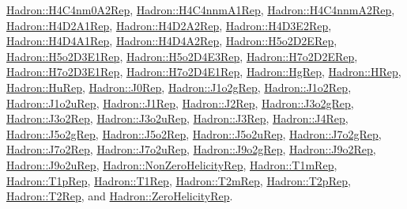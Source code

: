 \mbox{\hyperlink{structHadron_1_1H4C4nm0A2Rep}{Hadron\+::\+H4\+C4nm0\+A2\+Rep}}, \mbox{\hyperlink{structHadron_1_1H4C4nnmA1Rep}{Hadron\+::\+H4\+C4nnm\+A1\+Rep}}, \mbox{\hyperlink{structHadron_1_1H4C4nnmA2Rep}{Hadron\+::\+H4\+C4nnm\+A2\+Rep}}, \mbox{\hyperlink{structHadron_1_1H4D2A1Rep}{Hadron\+::\+H4\+D2\+A1\+Rep}}, \mbox{\hyperlink{structHadron_1_1H4D2A2Rep}{Hadron\+::\+H4\+D2\+A2\+Rep}}, \mbox{\hyperlink{structHadron_1_1H4D3E2Rep}{Hadron\+::\+H4\+D3\+E2\+Rep}}, \mbox{\hyperlink{structHadron_1_1H4D4A1Rep}{Hadron\+::\+H4\+D4\+A1\+Rep}}, \mbox{\hyperlink{structHadron_1_1H4D4A2Rep}{Hadron\+::\+H4\+D4\+A2\+Rep}}, \mbox{\hyperlink{structHadron_1_1H5o2D2ERep}{Hadron\+::\+H5o2\+D2\+E\+Rep}}, \mbox{\hyperlink{structHadron_1_1H5o2D3E1Rep}{Hadron\+::\+H5o2\+D3\+E1\+Rep}}, \mbox{\hyperlink{structHadron_1_1H5o2D4E3Rep}{Hadron\+::\+H5o2\+D4\+E3\+Rep}}, \mbox{\hyperlink{structHadron_1_1H7o2D2ERep}{Hadron\+::\+H7o2\+D2\+E\+Rep}}, \mbox{\hyperlink{structHadron_1_1H7o2D3E1Rep}{Hadron\+::\+H7o2\+D3\+E1\+Rep}}, \mbox{\hyperlink{structHadron_1_1H7o2D4E1Rep}{Hadron\+::\+H7o2\+D4\+E1\+Rep}}, \mbox{\hyperlink{structHadron_1_1HgRep}{Hadron\+::\+Hg\+Rep}}, \mbox{\hyperlink{structHadron_1_1HRep}{Hadron\+::\+H\+Rep}}, \mbox{\hyperlink{structHadron_1_1HuRep}{Hadron\+::\+Hu\+Rep}}, \mbox{\hyperlink{structHadron_1_1J0Rep}{Hadron\+::\+J0\+Rep}}, \mbox{\hyperlink{structHadron_1_1J1o2gRep}{Hadron\+::\+J1o2g\+Rep}}, \mbox{\hyperlink{structHadron_1_1J1o2Rep}{Hadron\+::\+J1o2\+Rep}}, \mbox{\hyperlink{structHadron_1_1J1o2uRep}{Hadron\+::\+J1o2u\+Rep}}, \mbox{\hyperlink{structHadron_1_1J1Rep}{Hadron\+::\+J1\+Rep}}, \mbox{\hyperlink{structHadron_1_1J2Rep}{Hadron\+::\+J2\+Rep}}, \mbox{\hyperlink{structHadron_1_1J3o2gRep}{Hadron\+::\+J3o2g\+Rep}}, \mbox{\hyperlink{structHadron_1_1J3o2Rep}{Hadron\+::\+J3o2\+Rep}}, \mbox{\hyperlink{structHadron_1_1J3o2uRep}{Hadron\+::\+J3o2u\+Rep}}, \mbox{\hyperlink{structHadron_1_1J3Rep}{Hadron\+::\+J3\+Rep}}, \mbox{\hyperlink{structHadron_1_1J4Rep}{Hadron\+::\+J4\+Rep}}, \mbox{\hyperlink{structHadron_1_1J5o2gRep}{Hadron\+::\+J5o2g\+Rep}}, \mbox{\hyperlink{structHadron_1_1J5o2Rep}{Hadron\+::\+J5o2\+Rep}}, \mbox{\hyperlink{structHadron_1_1J5o2uRep}{Hadron\+::\+J5o2u\+Rep}}, \mbox{\hyperlink{structHadron_1_1J7o2gRep}{Hadron\+::\+J7o2g\+Rep}}, \mbox{\hyperlink{structHadron_1_1J7o2Rep}{Hadron\+::\+J7o2\+Rep}}, \mbox{\hyperlink{structHadron_1_1J7o2uRep}{Hadron\+::\+J7o2u\+Rep}}, \mbox{\hyperlink{structHadron_1_1J9o2gRep}{Hadron\+::\+J9o2g\+Rep}}, \mbox{\hyperlink{structHadron_1_1J9o2Rep}{Hadron\+::\+J9o2\+Rep}}, \mbox{\hyperlink{structHadron_1_1J9o2uRep}{Hadron\+::\+J9o2u\+Rep}}, \mbox{\hyperlink{structHadron_1_1NonZeroHelicityRep}{Hadron\+::\+Non\+Zero\+Helicity\+Rep}}, \mbox{\hyperlink{structHadron_1_1T1mRep}{Hadron\+::\+T1m\+Rep}}, \mbox{\hyperlink{structHadron_1_1T1pRep}{Hadron\+::\+T1p\+Rep}}, \mbox{\hyperlink{structHadron_1_1T1Rep}{Hadron\+::\+T1\+Rep}}, \mbox{\hyperlink{structHadron_1_1T2mRep}{Hadron\+::\+T2m\+Rep}}, \mbox{\hyperlink{structHadron_1_1T2pRep}{Hadron\+::\+T2p\+Rep}}, \mbox{\hyperlink{structHadron_1_1T2Rep}{Hadron\+::\+T2\+Rep}}, and \mbox{\hyperlink{structHadron_1_1ZeroHelicityRep}{Hadron\+::\+Zero\+Helicity\+Rep}}.

